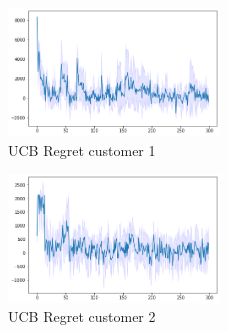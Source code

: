 \begin{multicols}{2}
    \begin{figure}[H]
        \begin{center}
        \includegraphics[width=0.5\textwidth]{img/ucb7_1regret.png}
        \caption{UCB Regret customer 1}
        \label{fig:regret71}
        \end{center}
    \end{figure}
    \columnbreak
    \begin{figure}[H]
        \begin{center}
        \includegraphics[width=0.5\textwidth]{img/ucb7_2regret.png}
        \caption{UCB Regret customer 2}
        \label{fig:regret72}
        \end{center}
    \end{figure}
\end{multicols}
